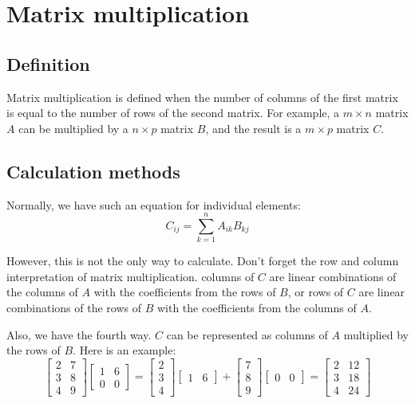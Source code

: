 \documentclass[10pt,a4paper,oneside,numbers=noenddot]{scrbook}
\theoremstyle{ctplain}
\theoremstyle{ctresult}
\begin{document}
\section{Matrix multiplication}
\subsection{Definition}

Matrix multiplication is defined when the number of columns of the first matrix is
equal to the number of rows of the second matrix. For example, a $m \times n$ matrix
$A$ can be multiplied by a $n \times p$ matrix $B$, and the result is a $m \times p$
matrix $C$.

\subsection{Calculation methods}

Normally, we have such an equation for individual elements:
\[
  C_{ij} = \sum_{k=1}^{n} A_{ik} B_{kj}
\]

However, this is not the only way to calculate. Don't forget the row and column
interpretation of matrix multiplication. columns of $C$ are linear combinations of
the columns of $A$ with the coefficients from the rows of $B$, or rows of $C$ are linear
combinations of the rows of $B$ with the coefficients from the columns of $A$.

Also, we have the fourth way. $C$ can be represented as columns of $A$ multiplied by
the rows of $B$. Here is an example:
\[
  \begin{bmatrix}
    2 & 7 \\ 3 & 8 \\ 4 & 9
  \end{bmatrix}
  \begin{bmatrix}
    1 & 6 \\ 0 & 0
  \end{bmatrix}
  =
  \begin{bmatrix}
    2 \\ 3 \\ 4
  \end{bmatrix}
  \begin{bmatrix}
    1 & 6
  \end{bmatrix}
  +
  \begin{bmatrix}
    7 \\ 8 \\9
  \end{bmatrix}
  \begin{bmatrix}
    0 & 0
  \end{bmatrix}
  =
  \begin{bmatrix}
    2 & 12 \\ 3 & 18 \\ 4 & 24
  \end{bmatrix}
\]
\end{document}
